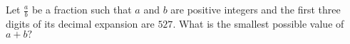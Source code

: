 Let $\tfrac{a}{b}$ be a fraction such that $a$ and $b$ are positive integers and the first three digits of its decimal expansion are $527$. What is the smallest possible value of $a+b?$